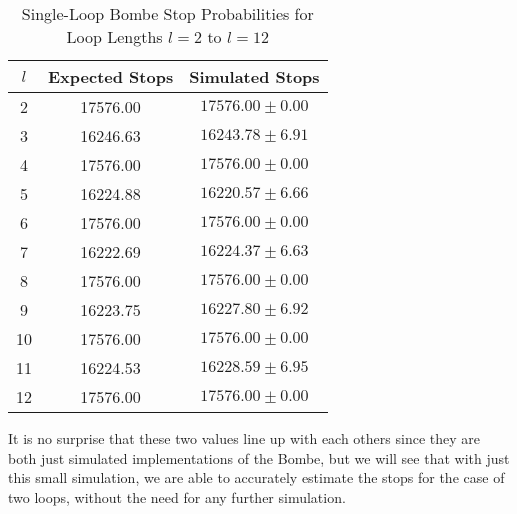 \begin{table}[H]
\centering

\begin{tabular}{|c|c|c|}
\hline
{\bf{ $l$ }} & {\bf{ Expected Stops }} & {\bf{ Simulated Stops }}\\
\hline
2 & 17576.00 & $17576.00 \pm 0.00$\\
\hline
3 & 16246.63 & $16243.78 \pm 6.91$\\
\hline
4 & 17576.00 & $17576.00 \pm 0.00$\\
\hline
5 & 16224.88 & $16220.57 \pm 6.66$\\
\hline
6 & 17576.00 & $17576.00 \pm 0.00$\\
\hline
7 & 16222.69 & $16224.37 \pm 6.63$\\
\hline
8 & 17576.00 & $17576.00 \pm 0.00$\\
\hline
9 & 16223.75 & $16227.80 \pm 6.92$\\
\hline
10 & 17576.00 & $17576.00 \pm 0.00$\\
\hline
11 & 16224.53 & $16228.59 \pm 6.95$\\
\hline
12 & 17576.00 & $17576.00 \pm 0.00$\\
\hline
\end{tabular}
\caption{Single-Loop Bombe Stop Probabilities for Loop Lengths $l=2$ to $l=12$}
\end{table}
\noindent It is no surprise that these two values line up with each others since they are both just simulated implementations of the Bombe, but we will see that with just this small simulation, we are able to accurately estimate the stops for the case of two loops, without the need for any further simulation.
